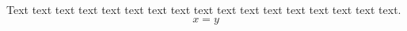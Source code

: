 \documentclass{lcfleqn}
\begin{document}
Text text text text text text text text text text text text text text text text text.
\begin{equation}x=y\end{equation}
\end{document}
